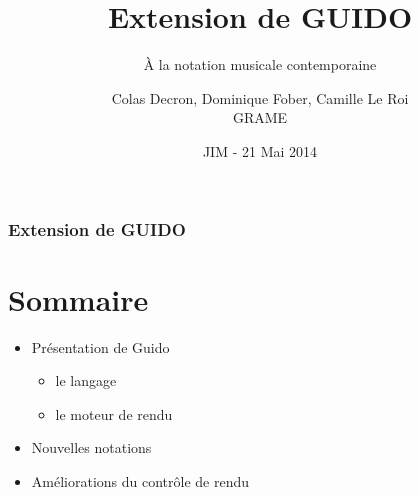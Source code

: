\documentclass[12pt]{beamer}
\title{Extension de GUIDO}
\subtitle{\`A la notation musicale contemporaine}
\author{Colas Decron, Dominique Fober, Camille Le Roi \\ GRAME}
\date{JIM - 21 Mai 2014}
\begin{document}


    \begin{frame}
    \frametitle{Extension de GUIDO}
    \section{Sommaire}
    
    \Large    
    \begin{itemize}
      \item Présentation de Guido
      \begin{itemize}
        \item le langage
        \item le moteur de rendu
      \end{itemize}
      \item Nouvelles notations
      \item Améliorations du contrôle de rendu
    \end{itemize}
    
    \end{frame}

\end{document}
